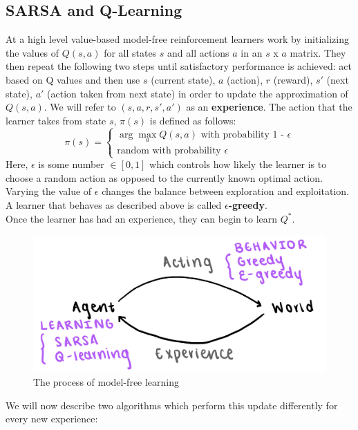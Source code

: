 \subsection{SARSA and Q-Learning}
At a high level value-based model-free reinforcement learners work by initializing the values of $Q(s, a)$ for all states $s$ and all actions $a$ in an $s$ x $a$ matrix. They then repeat the following two steps until satisfactory performance is achieved: act based on Q values and then use $s$ (current state), $a$ (action), $r$ (reward), $s'$ (next state), $a'$ (action taken from next state) in order to update the approximation of $Q(s, a)$. We will refer to $(s, a, r, s', a')$ as an \textbf{experience}. The action that the learner takes from state $s$, $\pi(s)$ is defined as follows:
\begin{equation}
    \pi(s) = 
    \begin{cases} 
      \arg\!\max_aQ(s, a) \text{ with probability 1 - }\epsilon \\
      \text{random with probability }\epsilon
    \end{cases}
\end{equation}
Here, $\epsilon$ is some number $\in [0, 1]$ which controls how likely the learner is to choose a random action as opposed to the currently known optimal action. Varying the value of $\epsilon$ changes the balance between exploration and exploitation. A learner that behaves as described above is called $\epsilon$\textbf{-greedy}.\\
Once the learner has had an experience, they can begin to learn $Q^*$. 
\begin{figure}[ht!]
    \centering
    \includegraphics[scale=0.2]{../ReinforcementLearning/fig/model-free.jpeg}
    \caption{The process of model-free learning}
\end{figure}
We will now describe two algorithms which perform this update differently for every new experience:
